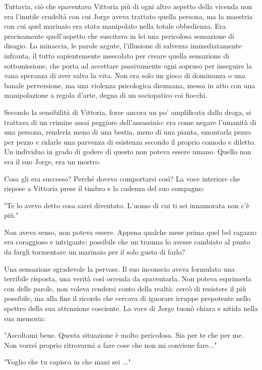 Tuttavia, ciò che spaventava Vittoria più di ogni altro aspetto della vicenda non era l'inutile crudeltà con cui Jorge aveva trattato quella persona, ma la maestria con cui quel marinaio era stata manipolato nella totale obbedienza. Era precisamente quell'aspetto che suscitava in lei una pericolosa sensazione di disagio. La minaccia, le parole argute, l'illusione di salvezza immediatamente infranta, il tutto sapientemente mescolato per creare quella sensazione di sottomissione, che porta ad accettare passivamente ogni sopruso per inseguire la vana speranza di aver salva la vita. Non era solo un gioco di dominanza o una banale perversione, ma una violenza psicologica disumana, messa in atto con una manipolazione a regola d'arte, degna di un sociopatico coi fiocchi.

Secondo la sensibilità di Vittoria, forse ancora un po' amplificata dalla droga, si trattava di un crimine assai peggiore dell'assassinio: era come negare l'umanità di una persona, renderla meno di una bestia, meno di una pianta, smontarla pezzo per pezzo e ridarle una parvenza di esistenza secondo il proprio comodo e diletto. Un individuo in grado di godere di questo non poteva essere umano. Quello non era il suo Jorge, era un mostro.

Cosa gli era successo? Perché doveva comportarsi così? La voce interiore che rispose a Vittoria prese il timbro e la cadenza del suo compagno:

"Te lo avevo detto cosa sarei diventato. L'uomo di cui ti sei innamorata non c'è più."

Non aveva senso, non poteva essere. Appena qualche mese prima quel bel ragazzo era coraggioso e intrigante; possibile che un trauma lo avesse cambiato al punto da fargli tormentare un marinaio per il solo gusto di farlo?

Una sensazione sgradevole la pervase. Il suo inconscio aveva formulato una terribile risposta, una verità così orrenda da spaventarla. Non poteva esprimerla con delle parole, non voleva rendersi conto della realtà: cercò di resistere il più possibile, ma alla fine il ricordo che cercava di ignorare irruppe prepotente nello spettro della sua attenzione cosciente. La voce di Jorge tuonò chiara e nitida nella sua memoria:

"Ascoltami bene. Questa situazione è molto pericolosa. Sia per te che per me. Non vorrei proprio ritrovarmi a fare cose che non mi conviene fare..."

"Voglio che tu capisca in che mani sei ..."

